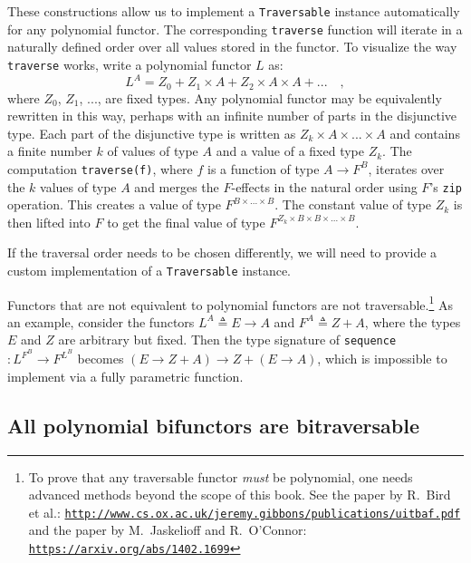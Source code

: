 These constructions allow us to implement a \lstinline!Traversable!
instance automatically for any polynomial functor. The corresponding
\lstinline!traverse! function will iterate in a naturally defined
order over all values stored in the functor. To visualize the way
\lstinline!traverse! works, write a polynomial functor $L$ as:
\[
L^{A}=Z_{0}+Z_{1}\times A+Z_{2}\times A\times A+...\quad,
\]
where $Z_{0}$, $Z_{1}$, ..., are fixed types. Any polynomial functor
may be equivalently rewritten in this way, perhaps with an infinite
number of parts in the disjunctive type. Each part of the disjunctive
type is written as $Z_{k}\times A\times...\times A$ and contains
a finite number $k$ of values of type $A$ and a value of a fixed
type $Z_{k}$. The computation \lstinline!traverse(f)!, where $f$
is a function of type $A\rightarrow F^{B}$, iterates over the $k$
values of type $A$ and merges the $F$-effects in the natural order
using $F$\textsf{'}s \lstinline!zip! operation. This creates a value of type
$F^{B\times...\times B}$. The constant value of type $Z_{k}$ is
then lifted into $F$ to get the final value of type $F^{Z_{k}\times B\times B\times...\times B}$.

If the traversal order needs to be chosen differently, we will need
to provide a custom implementation of a \lstinline!Traversable! instance.

Functors that are not equivalent to polynomial functors are not traversable.\footnote{To prove that any traversable functor \emph{must} be polynomial, one
needs advanced methods beyond the scope of this book. See the paper
by R.~Bird et al.: \texttt{\href{http://www.cs.ox.ac.uk/jeremy.gibbons/publications/uitbaf.pdf}{http://www.cs.ox.ac.uk/jeremy.gibbons/publications/uitbaf.pdf}}
and the paper by M.~Jaskelioff and R.~O\textsf{'}Connor:
\texttt{\href{https://arxiv.org/abs/1402.1699}{https://arxiv.org/abs/1402.1699}}} As an example, consider the functors $L^{A}\triangleq E\rightarrow A$
and $F^{A}\triangleq Z+A$, where the types $E$ and $Z$ are arbitrary
but fixed. Then the type signature of \lstinline!sequence! $:L^{F^{B}}\rightarrow F^{L^{B}}$
becomes $(E\rightarrow Z+A)\rightarrow Z+(E\rightarrow A)$, which
is impossible to implement via a fully parametric function.

\subsection{All polynomial bifunctors are bitraversable\label{subsec:All-polynomial-bifunctors-are-bitraversable}}

